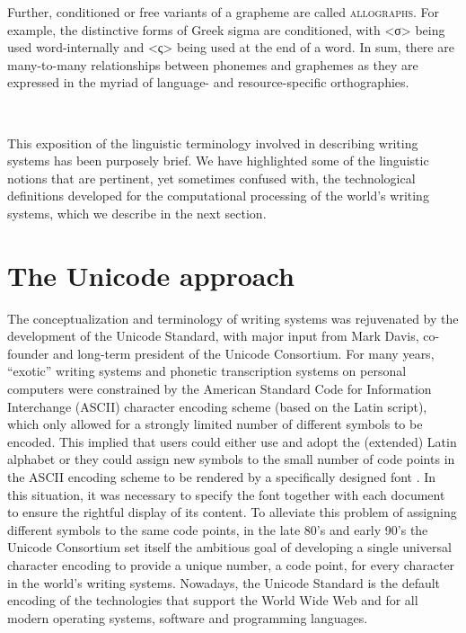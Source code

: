 Further, conditioned or free variants of a grapheme are called
\textsc{allographs}. For example, the distinctive forms of Greek sigma are
conditioned, with <σ> being used word-internally and <ς> being used at the end
of a word. In sum, there are many-to-many relationships between phonemes and
graphemes as they are expressed in the myriad of language- and resource-specific
orthographies.

\ 

\noindent This exposition of the linguistic terminology involved in describing writing
systems has been purposely brief. We have highlighted some of the linguistic
notions that are pertinent, yet sometimes confused with, the technological
definitions developed for the computational processing of the world's writing
systems, which we describe in the next section.

\section{The Unicode approach}
\label{the-unicode-approach}

The conceptualization and terminology of writing systems was rejuvenated by
the development of the Unicode Standard, with major input from Mark Davis,
co-founder and long-term president of the Unicode Consortium. For many years,
``exotic'' writing systems and phonetic transcription systems on personal
computers were constrained by the American Standard Code for Information
Interchange (ASCII) character encoding scheme (based on the Latin script), which
only allowed for a strongly limited number of different symbols to be encoded.
This implied that users could either use and adopt the (extended) Latin alphabet
or they could assign new symbols to the small number of code points in the ASCII
encoding scheme to be rendered by a specifically designed font
\citep{BirdSimons2003}. In this situation, it was necessary to specify the font
together with each document to ensure the rightful display of its content. To
alleviate this problem of assigning different symbols to the same code points,
in the late 80's and early 90's the Unicode Consortium set itself the ambitious
goal of developing a single universal character encoding to provide a unique
number, a code point, for every character in the world's writing systems.
Nowadays, the Unicode Standard is the default encoding of the technologies that
support the World Wide Web and for all modern operating systems, software and
programming languages.

